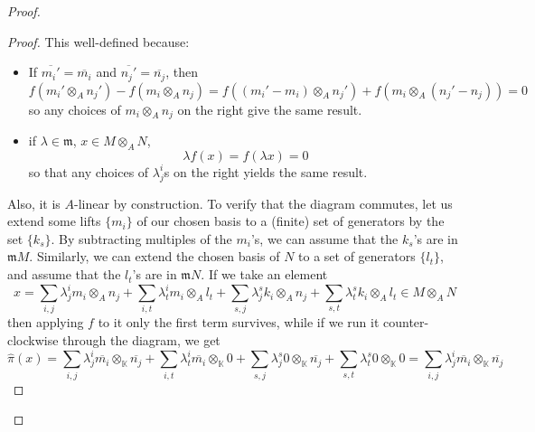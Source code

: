 \begin{problem}
\begin{enumerate}[label=(\theproblem.\arabic*),ref=\theproblem.\arabic*]
\begin{sol}
\begin{proof}
\begin{claim}
\begin{proof}
                                This well-defined because:
                                \begin{itemize}
                                    \item If $\overline{m_i'} = \overline{m_i}$ and $\overline{n_j'} = \overline{n_j}$, then
                                    \[f(m_i' \otimes_A n_j') - f(m_i \otimes_A n_j) = f((m_i' - m_i) \otimes_A n_j') + f(m_i \otimes_A (n_j' - n_j)) = 0\]
                                    so any choices of $m_i \otimes_A n_j$ on the right give the same result.
                                    \item if ${\lambda \in \mathfrak{m}}$, ${x \in M \otimes_A N}$,
                                    \[\lambda f(x) = f(\lambda x) = 0\]
                                    so that any choices of $\lambda^i_j$s on the right yields the same result.
                                \end{itemize}

                                Also, it is $A$-linear by construction.
                                To verify that the diagram commutes, let us extend some lifts $\{m_i\}$ of our chosen basis
                                to a (finite) set of generators by the set $\{k_s\}$.
                                By subtracting multiples of the $m_i$'s, we can assume that the $k_s$'s are in $\mathfrak{m}M$.
                                Similarly, we can extend the chosen basis of $N$ to a set of generators $\{l_t\}$, and assume that the $l_t$'s are in $\mathfrak{m}N$.
                                If we take an element
                                \[
                                    x =
                                    \sum_{i,j} \lambda^i_j m_i \otimes_A n_j +
                                    \sum_{i, t} \lambda^i_t m_i \otimes_A l_t +
                                    \sum_{s, j} \lambda^s_j k_i \otimes_A n_j +
                                    \sum_{s, t} \lambda^s_t k_i \otimes_A l_t
                                    \in M \otimes_A N
                                \]
                                then applying $f$ to it only the first term survives,
                                while if we run it counter-clockwise through the diagram, we get
                                \[
                                    \hat{\pi}(x) =
                                    \sum_{i,j} \lambda^i_j \overline{m_i} \otimes_\mathbb{K} \overline{n_j} +
                                    \sum_{i, t} \lambda^i_t \overline{m_i} \otimes_\mathbb{K} 0 +
                                    \sum_{s, j} \lambda^s_j 0 \otimes_\mathbb{K} \overline{n_j} +
                                    \sum_{s, t} \lambda^s_t 0 \otimes_\mathbb{K} 0
                                    = \sum_{i,j} \lambda^i_j \overline{m_i} \otimes_\mathbb{K} \overline{n_j}
                                \]


\end{proof}
\end{claim}
\end{proof}
\end{sol}
\end{enumerate}
\end{problem}
